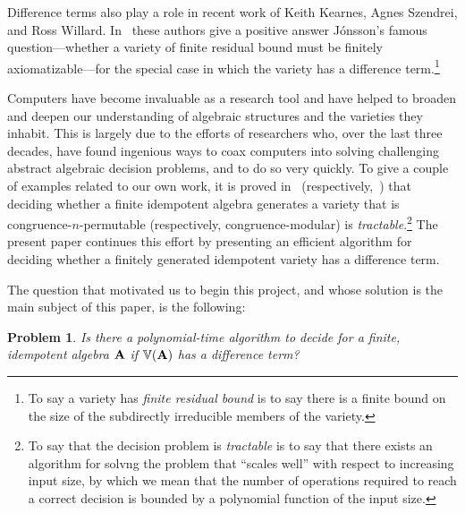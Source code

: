 \documentclass{ws-ijac}
\newtheorem{prob}{Problem}
\begin{document}

Difference terms also play a role in recent work of Keith Kearnes,
Agnes Szendrei, and Ross Willard.
In~\cite{MR3449235} these authors give a positive answer
J\'onsson's famous question---whether a variety of finite
residual bound must be finitely
axiomatizable---for the
special case in which the variety has a difference
term.\footnote{To say a variety has \emph{finite residual bound} is to say
  there is a finite bound on the size of the subdirectly irreducible
  members of the variety.}

Computers have become invaluable as a research tool and have helped to
broaden and deepen our understanding of algebraic structures and the
varieties they inhabit.  This is largely due to the efforts
of researchers who, over the last three decades, have found ingenious
ways to coax computers into solving challenging abstract algebraic
decision problems, and to do so very quickly.
To give a couple of examples related to our own work,
it is proved in~\cite{MR3239624} (respectively,~\cite{Freese:2009})
that deciding whether a finite idempotent algebra generates a variety that is congruence-$n$-permutable
(respectively, congruence-modular) is \emph{tractable}.\footnote{To
  say that the decision problem is \emph{tractable} is to say
  that there exists an algorithm for solvng the problem that ``scales
  well'' with respect to increasing input size, by which we mean that
  the number of operations required to reach a correct decision is
  bounded by a polynomial function of the input size.}
The present paper continues this effort by presenting an efficient
algorithm for deciding whether a finitely generated idempotent variety has a
difference term.

The question that motivated us to begin this project, and
whose solution is the main subject of this paper, is the following:
\begin{prob}
  \label{prob:1}
  Is there a polynomial-time algorithm to decide for a finite,
  idempotent algebra $\mathbf{A}$ if $\operatorname{\mathbb{V}}(\mathbf{A})$ has a difference term?
\end{prob}
\end{document}
